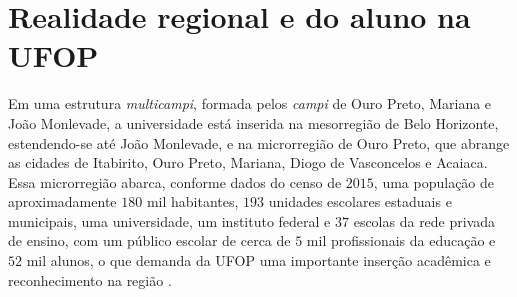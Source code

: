 \section{Realidade regional e do aluno na UFOP}
%
Em uma estrutura \textit{multicampi}, formada pelos \textit{campi} de Ouro Preto, Mariana e João Monlevade, a universidade está inserida na mesorregião de Belo Horizonte, estendendo-se até João Monlevade, e na microrregião de Ouro Preto, que abrange as cidades de Itabirito, Ouro Preto, Mariana, Diogo de Vasconcelos e Acaiaca. Essa microrregião abarca, conforme dados do censo de $2015$, uma população de aproximadamente $180$ mil habitantes, $193$ unidades escolares estaduais e municipais, uma universidade, um instituto federal e $37$ escolas da rede privada de ensino, com um público escolar de cerca de $5$ mil profissionais da educação e $52$ mil alunos, o que demanda da UFOP uma importante inserção acadêmica e reconhecimento na região \cite{resolucao-cuni-1}.
%

